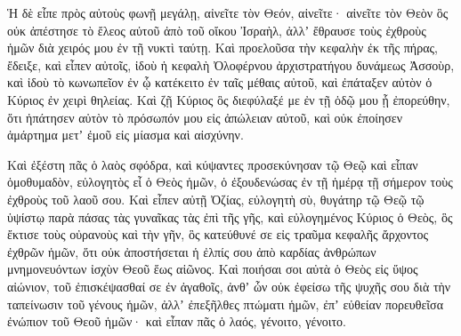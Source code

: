 {\par }{\PP {}Ἡ δὲ εἶπε πρὸς αὐτοὺς φωνῇ μεγάλῃ, αἰνεῖτε τὸν Θεόν, αἰνεῖτε· αἰνεῖτε τὸν Θεὸν ὃς οὐκ ἀπέστησε τὸ ἔλεος αὐτοῦ ἀπὸ τοῦ οἴκου Ἰσραὴλ, ἀλλʼ ἔθραυσε τοὺς ἐχθροὺς ἡμῶν διὰ χειρός μου ἐν τῇ νυκτὶ ταύτῃ.
Καὶ προελοῦσα τὴν κεφαλὴν ἐκ τῆς πήρας, ἔδειξε, καὶ εἶπεν αὐτοῖς, ἰδοὺ ἡ κεφαλὴ Ὀλοφέρνου ἀρχιστρατήγου δυνάμεως Ἀσσοὺρ, καὶ ἰδοὺ τὸ κωνωπεῖον ἐν ᾧ κατέκειτο ἐν ταῖς μέθαις αὐτοῦ, καὶ ἐπάταξεν αὐτὸν ὁ Κύριος ἐν χειρὶ θηλείας.
Καὶ ζῇ Κύριος ὃς διεφύλαξέ με ἐν τῇ ὁδῷ μου ᾗ ἐπορεύθην, ὅτι ἠπάτησεν αὐτὸν τὸ πρόσωπόν μου εἰς ἀπώλειαν αὐτοῦ, καὶ οὐκ ἐποίησεν ἁμάρτημα μετʼ ἐμοῦ εἰς μίασμα καὶ αἰσχύνην.
\par }{\PP {}Καὶ ἐξέστη πᾶς ὁ λαὸς σφόδρα, καὶ κύψαντες προσεκύνησαν τῷ Θεῷ καὶ εἶπαν ὁμοθυμαδὸν, εὐλογητὸς εἶ ὁ Θεὸς ἡμῶν, ὁ ἐξουδενώσας ἐν τῇ ἡμέρᾳ τῇ σήμερον τοὺς ἐχθροὺς τοῦ λαοῦ σου.
Καὶ εἶπεν αὐτῇ Ὀζίας, εὐλογητὴ σὺ, θυγάτηρ τῷ Θεῷ τῷ ὑψίστῳ παρὰ πάσας τὰς γυναῖκας τὰς ἐπὶ τῆς γῆς, καὶ εὐλογημένος Κύριος ὁ Θεὸς, ὃς ἔκτισε τοὺς οὐρανοὺς καὶ τὴν γῆν, ὃς κατεύθυνέ σε εἰς τραῦμα κεφαλῆς ἄρχοντος ἐχθρῶν ἡμῶν,
ὅτι οὐκ ἀποστήσεται ἡ ἐλπίς σου ἀπὸ καρδίας ἀνθρώπων μνημονευόντων ἰσχὺν Θεοῦ ἕως αἰῶνος.
Καὶ ποιήσαι σοι αὐτὰ ὁ Θεὸς εἰς ὕψος αἰώνιον, τοῦ ἐπισκέψασθαί σε ἐν ἀγαθοῖς, ἀνθʼ ὧν οὐκ ἐφείσω τῆς ψυχῆς σου διὰ τὴν ταπείνωσιν τοῦ γένους ἡμῶν, ἀλλʼ ἐπεξῆλθες πτώματι ἡμῶν, ἐπʼ εὐθείαν πορευθεῖσα ἐνώπιον τοῦ Θεοῦ ἡμῶν· καὶ εἶπαν πᾶς ὁ λαός, γένοιτο, γένοιτο.

}
